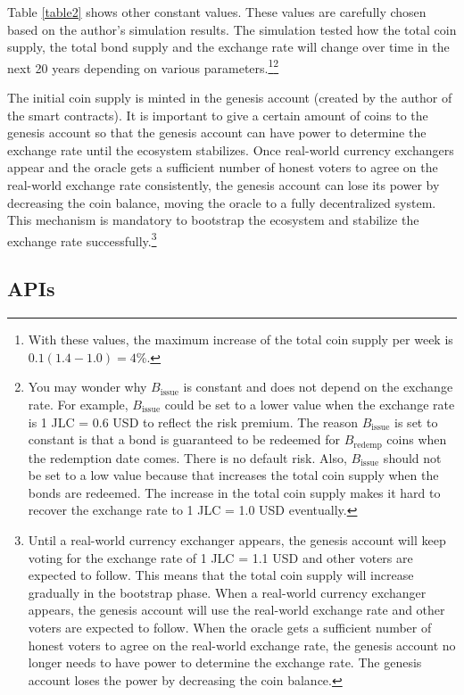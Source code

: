 \documentclass[dvipdfmx,a4paper]{article}
\begin{document}
Table \ref{table2} shows other constant values. These values are carefully chosen based on the author's simulation results. The simulation tested how the total coin supply, the total bond supply and the exchange rate will change over time in the next 20 years depending on various parameters.\footnote{With these values, the maximum increase of the total coin supply per week is $0.1(1.4 - 1.0)=4$\%.}\footnote{You may wonder why $B_{\mathrm{issue}}$ is constant and does not depend on the exchange rate. For example, $B_{\mathrm{issue}}$ could be set to a lower value when the exchange rate is 1 JLC = 0.6 USD to reflect the risk premium. The reason $B_{\mathrm{issue}}$ is set to constant is that a bond is guaranteed to be redeemed for $B_{\mathrm{redemp}}$ coins when the redemption date comes. There is no default risk. Also, $B_{\mathrm{issue}}$ should not be set to a low value because that increases the total coin supply when the bonds are redeemed. The increase in the total coin supply makes it hard to recover the exchange rate to 1 JLC = 1.0 USD eventually.}

The initial coin supply is minted in the genesis account (created by the author of the smart contracts). It is important to give a certain amount of coins to the genesis account so that the genesis account can have power to determine the exchange rate until the ecosystem stabilizes. Once real-world currency exchangers appear and the oracle gets a sufficient number of honest voters to agree on the real-world exchange rate consistently, the genesis account can lose its power by decreasing the coin balance, moving the oracle to a fully decentralized system. This mechanism is mandatory to bootstrap the ecosystem and stabilize the exchange rate successfully.\footnote{Until a real-world currency exchanger appears, the genesis account will keep voting for the exchange rate of 1 JLC = 1.1 USD and other voters are expected to follow. This means that the total coin supply will increase gradually in the bootstrap phase. When a real-world currency exchanger appears, the genesis account will use the real-world exchange rate and other voters are expected to follow. When the oracle gets a sufficient number of honest voters to agree on the real-world exchange rate, the genesis account no longer needs to have power to determine the exchange rate. The genesis account loses the power by decreasing the coin balance.}

\subsection{APIs}
\end{document}
